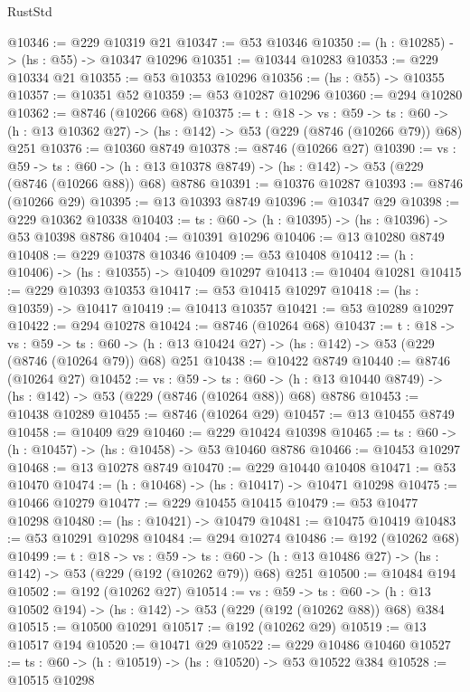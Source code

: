\begin{lexlean}{RustStd}
\begin{coremodule}
@10346 := @229 @10319 @21
@10347 := @53 @10346
@10350 := (h : @10285) -> (hs : @55) -> @10347 @10296
@10351 := @10344 @10283
@10353 := @229 @10334 @21
@10355 := @53 @10353 @10296
@10356 := (hs : @55) -> @10355
@10357 := @10351 @52
@10359 := @53 @10287 @10296
@10360 := @294 @10280
@10362 := @8746 (@10266 @68)
@10375 := {t : @18} ->
  {vs : @59} ->
  {ts : @60} -> (h : @13 @10362 @27) -> (hs : @142) -> @53 (@229 (@8746 (@10266 @79)) @68) @251
@10376 := @10360 @8749
@10378 := @8746 (@10266 @27)
@10390 := {vs : @59} ->
  {ts : @60} -> (h : @13 @10378 @8749) -> (hs : @142) -> @53 (@229 (@8746 (@10266 @88)) @68) @8786
@10391 := @10376 @10287
@10393 := @8746 (@10266 @29)
@10395 := @13 @10393 @8749
@10396 := @10347 @29
@10398 := @229 @10362 @10338
@10403 := {ts : @60} -> (h : @10395) -> (hs : @10396) -> @53 @10398 @8786
@10404 := @10391 @10296
@10406 := @13 @10280 @8749
@10408 := @229 @10378 @10346
@10409 := @53 @10408
@10412 := (h : @10406) -> (hs : @10355) -> @10409 @10297
@10413 := @10404 @10281
@10415 := @229 @10393 @10353
@10417 := @53 @10415 @10297
@10418 := (hs : @10359) -> @10417
@10419 := @10413 @10357
@10421 := @53 @10289 @10297
@10422 := @294 @10278
@10424 := @8746 (@10264 @68)
@10437 := {t : @18} ->
  {vs : @59} ->
  {ts : @60} -> (h : @13 @10424 @27) -> (hs : @142) -> @53 (@229 (@8746 (@10264 @79)) @68) @251
@10438 := @10422 @8749
@10440 := @8746 (@10264 @27)
@10452 := {vs : @59} ->
  {ts : @60} -> (h : @13 @10440 @8749) -> (hs : @142) -> @53 (@229 (@8746 (@10264 @88)) @68) @8786
@10453 := @10438 @10289
@10455 := @8746 (@10264 @29)
@10457 := @13 @10455 @8749
@10458 := @10409 @29
@10460 := @229 @10424 @10398
@10465 := {ts : @60} -> (h : @10457) -> (hs : @10458) -> @53 @10460 @8786
@10466 := @10453 @10297
@10468 := @13 @10278 @8749
@10470 := @229 @10440 @10408
@10471 := @53 @10470
@10474 := (h : @10468) -> (hs : @10417) -> @10471 @10298
@10475 := @10466 @10279
@10477 := @229 @10455 @10415
@10479 := @53 @10477 @10298
@10480 := (hs : @10421) -> @10479
@10481 := @10475 @10419
@10483 := @53 @10291 @10298
@10484 := @294 @10274
@10486 := @192 (@10262 @68)
@10499 := {t : @18} ->
  {vs : @59} ->
  {ts : @60} -> (h : @13 @10486 @27) -> (hs : @142) -> @53 (@229 (@192 (@10262 @79)) @68) @251
@10500 := @10484 @194
@10502 := @192 (@10262 @27)
@10514 := {vs : @59} ->
  {ts : @60} -> (h : @13 @10502 @194) -> (hs : @142) -> @53 (@229 (@192 (@10262 @88)) @68) @384
@10515 := @10500 @10291
@10517 := @192 (@10262 @29)
@10519 := @13 @10517 @194
@10520 := @10471 @29
@10522 := @229 @10486 @10460
@10527 := {ts : @60} -> (h : @10519) -> (hs : @10520) -> @53 @10522 @384
@10528 := @10515 @10298

\end{coremodule}
\end{lexlean}
